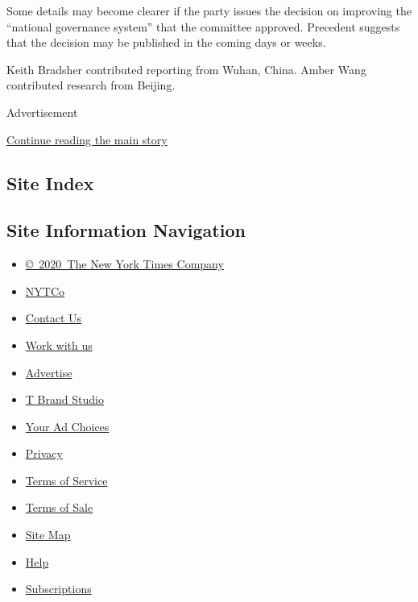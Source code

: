 Some details may become clearer if the party issues the decision on
improving the ``national governance system'' that the committee
approved. Precedent suggests that the decision may be published in the
coming days or weeks.

Keith Bradsher contributed reporting from Wuhan, China. Amber Wang
contributed research from Beijing.

Advertisement

\protect\hyperlink{after-bottom}{Continue reading the main story}

\hypertarget{site-index}{%
\subsection{Site Index}\label{site-index}}

\hypertarget{site-information-navigation}{%
\subsection{Site Information
Navigation}\label{site-information-navigation}}

\begin{itemize}
\tightlist
\item
  \href{https://help.nytimes3xbfgragh.onion/hc/en-us/articles/115014792127-Copyright-notice}{©~2020~The
  New York Times Company}
\end{itemize}

\begin{itemize}
\tightlist
\item
  \href{https://www.nytco.com/}{NYTCo}
\item
  \href{https://help.nytimes3xbfgragh.onion/hc/en-us/articles/115015385887-Contact-Us}{Contact
  Us}
\item
  \href{https://www.nytco.com/careers/}{Work with us}
\item
  \href{https://nytmediakit.com/}{Advertise}
\item
  \href{http://www.tbrandstudio.com/}{T Brand Studio}
\item
  \href{https://www.nytimes3xbfgragh.onion/privacy/cookie-policy\#how-do-i-manage-trackers}{Your
  Ad Choices}
\item
  \href{https://www.nytimes3xbfgragh.onion/privacy}{Privacy}
\item
  \href{https://help.nytimes3xbfgragh.onion/hc/en-us/articles/115014893428-Terms-of-service}{Terms
  of Service}
\item
  \href{https://help.nytimes3xbfgragh.onion/hc/en-us/articles/115014893968-Terms-of-sale}{Terms
  of Sale}
\item
  \href{https://spiderbites.nytimes3xbfgragh.onion}{Site Map}
\item
  \href{https://help.nytimes3xbfgragh.onion/hc/en-us}{Help}
\item
  \href{https://www.nytimes3xbfgragh.onion/subscription?campaignId=37WXW}{Subscriptions}
\end{itemize}
